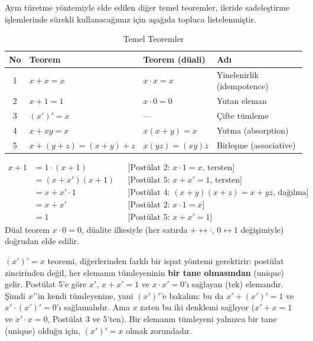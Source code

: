 Aynı türetme yöntemiyle elde edilen diğer temel teoremler, ileride sadeleştirme
işlemlerinde sürekli kullanacağımız için aşağıda topluca listelenmiştir.

\begin{table}[h]
\centering
\begin{tabular}{clll}
\toprule
No & Teorem & Teorem (düali) & Adı \\
\midrule
1 & $x+x=x$ & $x\cdot x=x$ & Yinelenirlik (idempotence) \\
2 & $x+1=1$ & $x\cdot 0=0$ & Yutan eleman \\
3 & $(x')'=x$ & --- & Çifte tümleme \\
4 & $x+xy=x$ & $x(x+y)=x$ & Yutma (absorption) \\
5 & $x+(y+z)=(x+y)+z$ & $x(yz)=(xy)z$ & Birleşme (associative) \\
\bottomrule
\end{tabular}
\caption{Temel Teoremler}
\end{table}

\begin{ornek}[Teorem 2'nin İspatı: $x+1=1$]
\begin{align*}
x+1 &= 1\cdot(x+1) & &\text{[Postülat 2: } x\cdot 1=x \text{, tersten]}\\
    &= (x+x')(x+1) & &\text{[Postülat 5: } x+x'=1 \text{, tersten]}\\
    &= x+x'\cdot 1 & &\text{[Postülat 4: } (x+y)(x+z)=x+yz \text{, dağılma]}\\
    &= x+x' & &\text{[Postülat 2: } x\cdot 1=x \text{]}\\
    &= 1 & &\text{[Postülat 5: } x+x'=1 \text{]}
\end{align*}
Düal teorem $x\cdot 0=0$, düalite ilkesiyle (her satırda $+\leftrightarrow\cdot$,
$0\leftrightarrow 1$ değişimiyle) doğrudan elde edilir.
\end{ornek}

\begin{bilginot}
$(x')'=x$ teoremi, diğerlerinden farklı bir ispat yöntemi gerektirir: postülat zincirinden
değil, her elemanın tümleyeninin \textbf{bir tane olmasından} (unique) gelir. Postülat 5'e göre $x'$,
$x+x'=1$ ve $x\cdot x'=0$'ı sağlayan (tek) elemandır. Şimdi $x'$'in kendi tümleyenine, yani
$(x')'$'e bakalım: bu da $x'+(x')'=1$ ve $x'\cdot(x')'=0$'ı sağlamalıdır. Ama $x$ zaten bu
iki denklemi sağlıyor ($x'+x=1$ ve $x'\cdot x=0$, Postülat 3 ve 5'ten). Bir elemanın
tümleyeni yalnızca bir tane (unique) olduğu için, $(x')'=x$ olmak zorundadır.
\end{bilginot}

